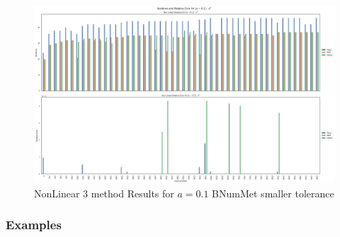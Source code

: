 \begin{figure}
    \centering
    \includegraphics[width=\textwidth]{Include/Images/Thesis/Analysis of Solutions/NonLinear AS/NonLinear 3 method Results Small Tol Bnum a-0.1.png}
    \caption{NonLinear 3 method Results for $a=0.1$ BNumMet smaller tolerance}
    \label{fig:NonLinear 3 method Results for a=0.1 BNumMet smaller tolerance}
\end{figure}


\subsubsection{Examples}
	
